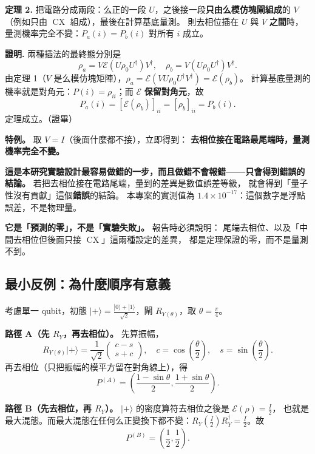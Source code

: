\documentclass[11pt,a4paper]{ctexart}
\begin{document}
\textbf{定理 2.} 把電路分成兩段：么正的一段
\(U\)，之後接一段\textbf{只由么模仿塊閘組成}的 \(V\) （例如只由
\(\operatorname{CX}\) 組成），最後在計算基底量測。 則去相位插在 \(U\) 與
\(V\) \textbf{之間}時，量測機率完全不變：\(P_{a}(i) = P_{b}(i)\) 對所有
\(i\) 成立。

\textbf{證明.} 兩種插法的最終態分別是
\[\rho_{a} = V\mathcal{E}(U\rho_{0}U^{\dagger})V^{\dagger},\quad\rho_{b} = V\left( U\rho_{0}U^{\dagger} \right)V^{\dagger}.\]
由定理 1（\(V\)
是么模仿塊矩陣），\(\rho_{a} = \mathcal{E}(VU\rho_{0}U^{\dagger}V^{\dagger}) = \mathcal{E}(\rho_{b})\)。
計算基底量測的機率就是對角元：\(P(i) = \rho_{ii}\)；而 \(\mathcal{E}\)
\textbf{保留對角元}，故
\[P_{a}(i) = \left\lbrack \mathcal{E}(\rho_{b}) \right\rbrack_{ii} = \left\lbrack \rho_{b} \right\rbrack_{ii} = P_{b}(i).\]
定理成立。（證畢）

\textbf{特例。} 取 \(V = I\)（後面什麼都不接），立即得到：
\textbf{去相位接在電路最尾端時，量測機率完全不變。}

\textbf{這是本研究實驗設計最容易做錯的一步，而且做錯不會報錯------只會得到錯誤的結論。}
若把去相位接在電路尾端，量到的差異是數值誤差等級，
就會得到「量子性沒有貢獻」這個\textbf{錯誤}的結論。 本專案的實測值為
\(1.4 \times 10^{- 17}\)：這個數字是浮點誤差，不是物理量。

\textbf{它是「預測的零」，不是「實驗失敗」。} 報告時必須說明：
尾端去相位、以及「中間去相位但後面只接
\(\operatorname{CX}\)」這兩種設定的差異，
都是定理保證的零，而不是量測不到。

\subsection{最小反例：為什麼順序有意義}

考慮單一 qubit，初態
\(| + \rangle = \frac{|0\rangle + |1\rangle}{\sqrt{2}}\)，閘
\(R_{Y(\theta)}\)，取 \(\theta = \frac{\pi}{4}\)。

\textbf{路徑 A（先 \(R_{Y}\)，再去相位）。} 先算振幅，
\[R_{Y(\theta)}| + \rangle = \frac{1}{\sqrt{2}}\begin{pmatrix}
c - s \\
s + c
\end{pmatrix},\quad c = \cos(\frac{\theta}{2}),\quad s = \sin(\frac{\theta}{2}).\]
再去相位（只把振幅的模平方留在對角線上），得
\[P^{(A)} = \left( \frac{1 - \sin\theta}{2},\frac{1 + \sin\theta}{2} \right).\]

\textbf{路徑 B（先去相位，再 \(R_{Y}\)）。} \(| + \rangle\)
的密度算符去相位之後是 \(\mathcal{E}(\rho) = \frac{I}{2}\)，
也就是最大混態。而最大混態在任何么正變換下都不變：\(R_{Y}\left( \frac{I}{2} \right)R_{Y}^{\dagger} = \frac{I}{2}\)。故
\[P^{(B)} = \left( \frac{1}{2},\frac{1}{2} \right).\]
\end{document}
